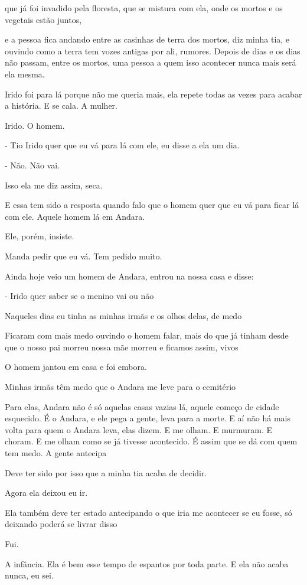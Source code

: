 que já foi invadido pela floresta, que se mistura com ela, onde os
mortos e os vegetais estão juntos,

e a pessoa fica andando entre as casinhas de terra dos mortos, diz minha
tia, e ouvindo como a terra tem vozes antigas por ali, rumores. Depois
de dias e os dias não passam, entre os mortos, uma pessoa a quem isso
acontecer nunca mais será ela mesma.

Irido foi para lá porque não me queria mais, ela repete todas as vezes
para acabar a história. E se cala. A mulher.

Irido. O homem.

- Tio Irido quer que eu vá para lá com ele, eu disse a ela um dia.

- Não. Não vai.

Isso ela me diz assim, seca.

E essa tem sido a resposta quando falo que o homem quer que eu vá para
ficar lá com ele. Aquele homem lá em Andara.

Ele, porém, insiste.

Manda pedir que eu vá. Tem pedido muito.

Ainda hoje veio um homem de Andara, entrou na nossa casa e disse:

- Irido quer saber se o menino vai ou não

Naqueles dias eu tinha as minhas irmãs e os olhos delas, de medo

Ficaram com mais medo ouvindo o homem falar, mais do que já tinham desde
que o nosso pai morreu nossa mãe morreu e ficamos assim, vivos

O homem jantou em casa e foi embora.

Minhas irmãs têm medo que o Andara me leve para o cemitério

Para elas, Andara não é só aquelas casas vazias lá, aquele começo de
cidade esquecido. É o Andara, e ele pega a gente, leva para a morte. E
aí não há mais volta para quem o Andara leva, elas dizem. E me olham. E
murmuram. E choram. E me olham como se já tivesse acontecido. É assim
que se dá com quem tem medo. A gente antecipa

Deve ter sido por isso que a minha tia acaba de decidir.

Agora ela deixou eu ir.

Ela também deve ter estado antecipando o que iria me acontecer se eu
fosse, só deixando poderá se livrar disso

Fui.

A infância. Ela é bem esse tempo de espantos por toda parte. E ela não
acaba nunca, eu sei.

